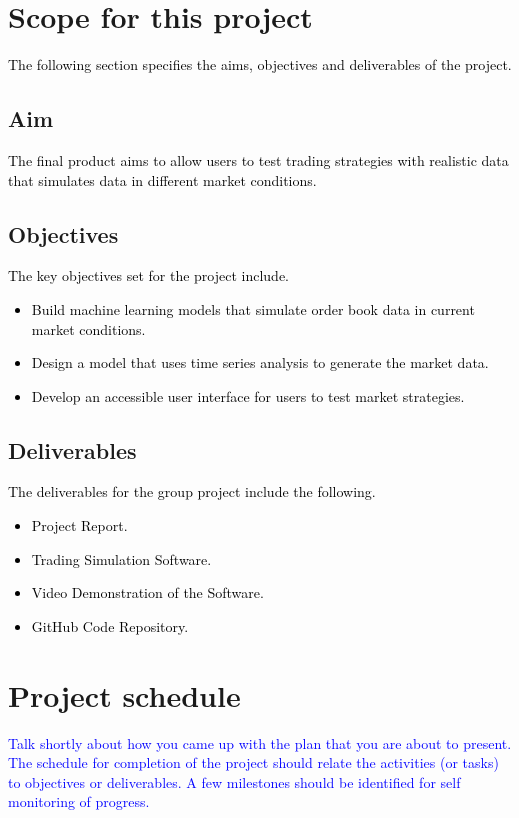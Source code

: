 \documentclass[acmtog, nonacm]{acmart}
\begin{document}
\section{Scope for this project}
\textcolor{black}{The following section specifies the aims, objectives and deliverables of the project. }

\subsection{Aim}
\textcolor{black}{The final product aims to allow users to test trading strategies with realistic data that simulates data in different market conditions.}

\subsection{Objectives}
\textcolor{black}{The key objectives set for the project include.
\begin{itemize}
    \item Build machine learning models that simulate order book data in current market conditions. 
    \item Design a model that uses time series analysis to generate the market data.
    \item Develop an accessible user interface for users to test market strategies. 
\end{itemize}
}

\subsection{Deliverables}
\textcolor{black}{The deliverables for the group project include the following.
\begin{itemize}
    \item Project Report.
    \item Trading Simulation Software.
    \item Video Demonstration of the Software.
    \item GitHub Code Repository. 
\end{itemize}
}

\section{Project schedule}
\textcolor{blue}{Talk shortly about how you came up with the plan that you are about to present. The schedule for completion of the project should relate the activities (or tasks) to objectives or deliverables. A few milestones should be identified for self monitoring of progress.
}
\end{document}
